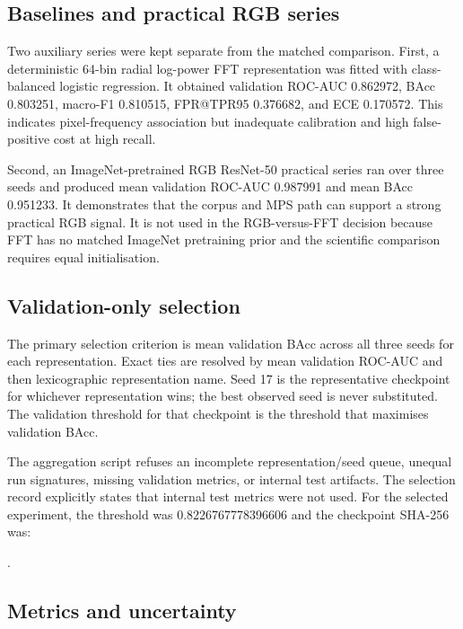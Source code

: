 \documentclass[12pt,a4paper]{article}
\begin{document}
\subsection{Baselines and practical RGB series}

Two auxiliary series were kept separate from the matched comparison. First, a deterministic
64-bin radial log-power FFT representation was fitted with class-balanced logistic regression. It
obtained validation ROC-AUC 0.862972, BAcc 0.803251, macro-F1 0.810515, FPR@TPR95 0.376682, and ECE
0.170572. This indicates pixel-frequency association but inadequate calibration and high
false-positive cost at high recall.

Second, an ImageNet-pretrained RGB ResNet-50 practical series ran over three seeds and produced mean
validation ROC-AUC 0.987991 and mean BAcc 0.951233. It demonstrates that the corpus and MPS path can
support a strong practical RGB signal. It is not used in the RGB-versus-FFT decision because FFT
has no matched ImageNet pretraining prior and the scientific comparison requires equal
initialisation.

\subsection{Validation-only selection}

The primary selection criterion is mean validation BAcc across all three seeds for each
representation. Exact ties are resolved by mean validation ROC-AUC and then lexicographic
representation name. Seed 17 is the representative checkpoint for whichever representation wins;
the best observed seed is never substituted. The validation threshold for that checkpoint is the
threshold that maximises validation BAcc.

The aggregation script refuses an incomplete representation/seed queue, unequal run signatures,
missing validation metrics, or internal test artifacts. The selection record explicitly states
that internal test metrics were not used. For the selected experiment, the threshold was
0.8226767778396606 and the checkpoint SHA-256 was:

\begin{center}
\small{}.
\end{center}

\subsection{Metrics and uncertainty}
\end{document}
